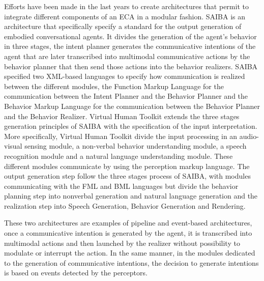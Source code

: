 
Efforts have been made in the last years to create architectures that permit to integrate different components of an ECA in a modular fashion. SAIBA is an architecture that specifically specify a standard for the output generation of embodied conversational agents. It divides the generation of the agent's behavior in three stages, the intent planner generates the communicative intentions of the agent that are later transcribed into multimodal communicative actions by the behavior planner that then send those actions into the behavior realizers. SAIBA specified two XML-based languages to specify how communication is realized between the different modules, the Function Markup Language for the communication between the Intent Planner and the Behavior Planner and the Behavior Markup Language for the communication between the Behavior Planner and the Behavior Realizer. 
Virtual Human Toolkit extends the three stages generation principles of SAIBA with the specification of the input interpretation. More specifically, Virtual Human Toolkit divide the input processing in an audio-visual sensing module, a non-verbal behavior understanding module, a speech recognition module and a natural language understanding module. These different modules communicate by using the perception markup language. The output generation step follow the three stages process of SAIBA, with modules communicating with the FML and BML languages but divide the behavior planning step into nonverbal generation and natural language generation and the realization step into Speech Generation, Behavior Generation and Rendering. 

These two architectures are examples of pipeline and event-based architectures, once a communicative intention is generated by the agent, it is transcribed into multimodal actions and then launched by the realizer without possibility to modulate or interrupt the action. In the same manner, in the modules dedicated to the generation of communicative intentions, the decision to generate intentions is based on events detected by the perceptors. 

